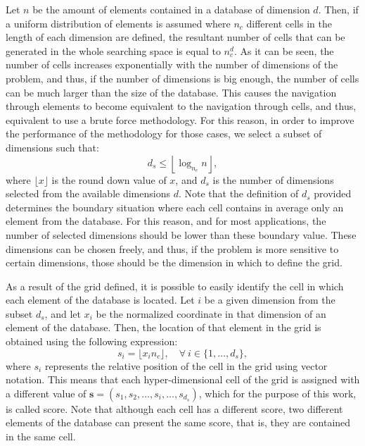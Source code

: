 \documentclass[review]{elsarticle}
\begin{document}
Let $n$ be the amount of elements contained in a database of dimension $d$. Then, if a uniform distribution of elements is assumed where $n_c$ different cells in the length of each dimension are defined, the resultant number of cells that can be generated in the whole searching space is equal to $n_c^d$. As it can be seen, the number of cells increases exponentially with the number of dimensions of the problem, and thus, if the number of dimensions is big enough, the number of cells can be much larger than the size of the database. This causes the navigation through elements to become equivalent to the navigation through cells, and thus, equivalent to use a brute force methodology. For this reason, in order to improve the performance of the methodology for those cases, we select a subset of dimensions such that:
\begin{equation} \label{eq:subdim}
d_s \leq \left\lfloor\log_{n_c}n\right\rfloor,
\end{equation}
where $\lfloor x \rfloor$ is the round down value of $x$, and $d_s$ is the number of dimensions selected from the available dimensions $d$. Note that the definition of $d_s$ provided determines the boundary situation where each cell contains in average only an element from the database. For this reason, and for most applications, the number of selected dimensions should be lower than these boundary value. These dimensions can be chosen freely, and thus, if the problem is more sensitive to certain dimensions, those should be the dimension in which to define the grid.

As a result of the grid defined, it is possible to easily identify the cell in which each element of the database is located. Let $i$ be a given dimension from the subset $d_s$, and let $x_i$ be the normalized coordinate in that dimension of an element of the database. Then, the location of that element in the grid is obtained using the following expression:
\begin{equation}\label{eq:v_score}
s_i = \lfloor x_i n_c \rfloor, \quad \forall \: i\in\{1,\dots,d_s\},
\end{equation}
where $s_i$ represents the relative position of the cell in the grid using vector notation. This means that each hyper-dimensional cell of the grid is assigned with a different value of $\mathbf{s} = (s_1, s_2, \dots, s_i, \dots, s_{d_s})$, which for the purpose of this work, is called score. Note that although each cell has a different score, two different elements of the database can present the same score, that is, they are contained in the same cell.
\end{document}
